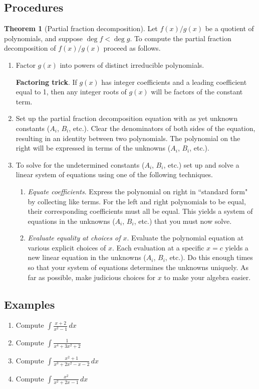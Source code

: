 \documentclass[11pt]{article}
\theoremstyle{definition}
\theoremstyle{named}
\newtheorem*{namedtheorem}{Theorem}
\numberwithin{myalgctr}{section}
\begin{document}
\subsection*{Procedures}
\begin{namedtheorem}[Partial fraction decomposition]
  Let $f(x)/g(x)$ be a quotient of polynomials, and suppose $\deg f<\deg g$. To compute the partial fraction decomposition of $f(x)/g(x)$ proceed as follows.
  \begin{enumerate}
    \item Factor $g(x)$ into powers of distinct irreducible polynomials.

    {\bf Factoring trick}. If $g(x)$ has integer coefficients and a leading coefficient equal to 1, then any integer roots of $g(x)$ will be factors of the constant term.
    \item Set up the partial fraction decomposition equation with as yet unknown constants ($A_i$, $B_i$, etc.). Clear the denominators of both sides of the equation, resulting in an identity between two polynomials. The polynomial on the right will be expressed in terms of the unknowns ($A_i$, $B_i$, etc.).
    \item To solve for the undetermined constants ($A_i$, $B_i$, etc.) set up and solve a linear system of equations using one of the following techniques.
    \begin{enumerate}
      \item {\em Equate coefficients}. Express the polynomial on right in ``standard form" by collecting like terms. For the left and right polynomials to be equal, their corresponding coefficients must all be equal. This yields a system of equations in the unknowns ($A_i$, $B_i$, etc.) that you must now solve.
      \item {\em Evaluate equality at choices of $x$}. Evaluate the polynomial equation at various explicit choices of $x$. Each evaluation at a specific $x=c$ yields a new linear equation in the unknowns ($A_i$, $B_i$, etc.). Do this enough times so that your system of equations determines the unknowns uniquely. As far as possible, make judicious choices for $x$ to make your algebra easier.
    \end{enumerate}
  \end{enumerate}

\end{namedtheorem}

\subsection*{Examples}
\begin{enumerate}
  \item Compute $\displaystyle\int \frac{x+2}{x^2-1}\, dx$
  \item Compute $\displaystyle\int\frac{1}{x^4+3x^2+2}$
  \item Compute $\displaystyle\int\frac{x^2+1}{x^3+2x^2-x-2}\, dx$
  \item Compute $\displaystyle\int \frac{x^2}{x^2+2x-1}\, dx$
\end{enumerate}
\end{document}
